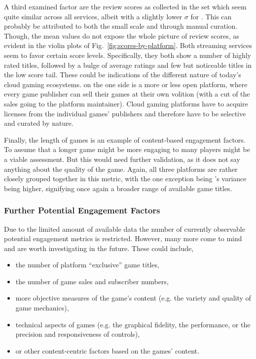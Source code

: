 A third examined factor are the review scores as collected in the \metacritic set which seem quite similar across all services, albeit with a slightly lower $\sigma$ for \gfnow. This can probably be attributed to both the small scale and through manual curation. Though, the mean values do not expose the whole picture of review scores, as evident in the violin plots of Fig.~\ref{fig:scores-by-platform}. Both streaming services seem to favor certain score levels. Specifically, they both show a number of highly rated titles, followed by a bulge of average ratings and few but noticeable titles in the low score tail. These could be indications of the different nature of today's cloud gaming ecosystems. \steam on the one side is a more or less open platform, where every game publisher can sell their games at their own volition (with a cut of the sales going to the platform maintainer). Cloud gaming platforms have to acquire licenses from the individual games' publishers and therefore have to be selective and curated by nature.

Finally, the length of games is an example of content-based engagement factors. To assume that a longer game might be more engaging to many players might be a viable assessment. But this would need further validation, as it does not say anything about the quality of the game. Again, all three platforms are rather closely grouped together in this metric, with the one exception being \steam's variance being higher, signifying once again a broader range of available game titles.

\subsubsection{Further Potential Engagement Factors}

Due to the limited amount of available data the number of currently observable potential engagement metrics is restricted. However, many more come to mind and are worth investigating in the future. These could include,

\begin{itemize}
	\item the number of platform ``exclusive'' game titles,
	\item the number of game sales and subscriber numbers,
	\item more objective measures of the game's content (e.g. the variety and quality of game mechanics),
	\item technical aspects of games (e.g. the graphical fidelity, the performance, or the precision and responsiveness of controls),
	\item or other content-centric factors based on the games' content.
\end{itemize}




